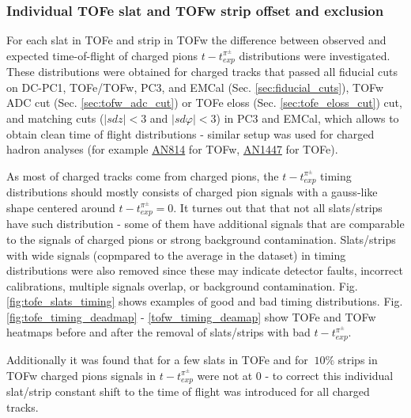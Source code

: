 \subsubsection{Individual TOFe slat and TOFw strip offset and exclusion}

For each slat in TOFe and strip in TOFw the difference between observed and expected time-of-flight of charged pions $t - t_{exp}^{\pi^\pm}$ distributions were investigated. 
These distributions were obtained for charged tracks that passed all fiducial cuts on DC-PC1, TOFe/TOFw, PC3, and EMCal (Sec. \ref{sec:fiducial_cuts}), TOFw ADC cut (Sec. \ref{sec:tofw_adc_cut}) or TOFe eloss (Sec. \ref{sec:tofe_eloss_cut}) cut, and matching cuts ($|sdz| < 3$ and $|sd\varphi| < 3$) in PC3 and EMCal, which allows to obtain clean time of flight distributions - similar setup was used for charged hadron analyses (for example \href{https://phenix-intra.sdcc.bnl.gov/phenix/WWW/p/draft/belmonrj/AnalysisNotes/ananoterun7.pdf}{AN814} for TOFw, \href{https://phenix-intra.sdcc.bnl.gov/phenix/WWW/p/draft/dlario/Charged_Hadrons_HeAu/AN1447_charged_hadrons_in_HeAu.pdf}{AN1447} for TOFe).

As most of charged tracks come from charged pions, the $t - t_{exp}^{\pi^\pm}$ timing distributions should mostly consists of charged pion signals with a gauss-like shape centered around $t - t_{exp}^{\pi^\pm} = 0$. 
It turnes out that that not all slats/strips have such distribution - some of them have additional signals that are comparable to the signals of charged pions or strong background contamination. 
Slats/strips with wide signals (copmpared to the average in the dataset) in timing distributions were also removed since these may indicate detector faults, incorrect calibrations, multiple signals overlap, or background contamination.
Fig. \ref{fig:tofe_slats_timing} shows examples of good and bad timing distributions.  Fig. \ref{fig:tofe_timing_deadmap} - \ref{tofw_timing_deamap} show TOFe and TOFw heatmaps before and after the removal of slats/strips with bad $t - t_{exp}^{\pi^\pm}$.

Additionally it was found that for a few slats in TOFe and for $~10\%$ strips in TOFw charged pions signals in $t - t_{exp}^{\pi^\pm}$ were not at 0 - to correct this individual slat/strip constant shift to the time of flight was introduced for all charged tracks.

